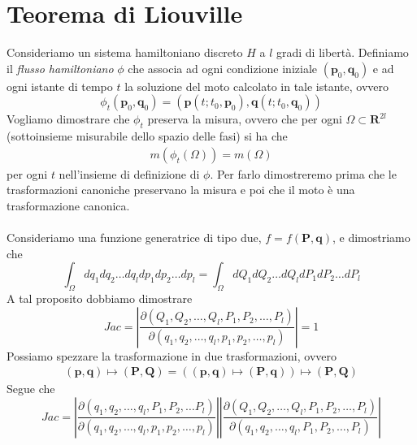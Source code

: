\documentclass{article}
\begin{document}
\section{Teorema di Liouville}
Consideriamo un sistema hamiltoniano discreto $H$ a $l$ gradi di libertà. Definiamo il \textit{flusso hamiltoniano} $\phi$ che associa ad ogni condizione iniziale $(\mathbf{p}_0, \mathbf{q}_0)$ e ad ogni istante di tempo $t$ la soluzione del moto calcolato in tale istante, ovvero
\begin{equation}
    \phi_t(\mathbf{p}_0, \mathbf{q}_0) = \left( \mathbf{p}(t; t_0, \mathbf{p}_0), \mathbf{q}(t; t_0, \mathbf{q}_0) \right) \tag{4.1}
\end{equation}
Vogliamo dimostrare che $\phi_t$ preserva la misura, ovvero che per ogni $\Omega \subset \mathbf{R}^{2l}$ (sottoinsieme misurabile dello spazio delle fasi) si ha che
\begin{align}
    m(\phi_t (\Omega)) = m (\Omega) \tag{4.2}
\end{align} 
per ogni $t$ nell'insieme di definizione di $\phi$. Per farlo dimostreremo prima che le trasformazioni canoniche preservano la misura e poi che il moto è una trasformazione canonica. \\ \\
Consideriamo una funzione generatrice di tipo due, $f = f(\mathbf{P}, \mathbf{q})$, e dimostriamo che
\begin{equation}
    \int_{\Omega} dq_1dq_2 \dots dq_l dp_1dp_2 \dots dp_l = \int_{\Omega} dQ_1 dQ_2 \dots dQ_l dP_1 dP_2 \dots dP_l \tag{4.3} 
\end{equation}
A tal proposito dobbiamo dimostrare
\begin{equation}
    Jac = \left| \frac{\partial(Q_1, Q_2, \dots, Q_l, P_1, P_2, \dots, P_l)}{\partial(q_1, q_2, \dots, q_l, p_1, p_2, \dots, p_l)} \right| = 1 \tag{4.4}
\end{equation}
Possiamo spezzare la trasformazione in due trasformazioni, ovvero
\begin{align}
    (\mathbf{p, \mathbf{q}}) \mapsto (\mathbf{P}, \mathbf{Q}) = ((\mathbf{p}, \mathbf{q}) \mapsto (\mathbf{P}, \mathbf{q})) \mapsto (\mathbf{P}, \mathbf{Q} \tag{4.5})
\end{align}
Segue che
\begin{equation}
    Jac = \left| \frac{\partial(q_1, q_2, \dots, q_l, P_1, P_2, \dots P_l)}{\partial(q_1, q_2, \dots, q_l, p_1, p_2, \dots, p_l)} \right|\left| \frac{\partial(Q_1, Q_2, \dots, Q_l, P_1, P_2, \dots, P_l)}{\partial(q_1, q_2, \dots, q_l, P_1, P_2, \dots, P_l)} \right| \tag{4.6}
\end{equation}
\end{document}
